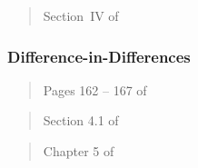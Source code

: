 \documentclass[12pt]{article}
\begin{document}
\begin{verse}  \end{verse}

\begin{verse}  \end{verse}

\begin{verse}  \end{verse}

\begin{verse} Section~IV of  \end{verse}

\subsubsection{Difference-in-Differences}\label{sec:did}

\begin{verse}  \end{verse}

\begin{verse} Pages 162 -- 167 of  \end{verse}

\begin{verse} Section 4.1 of  \end{verse}

\begin{verse} Chapter 5 of  \end{verse}

\begin{verse}  \end{verse}

\begin{verse}  \end{verse}

\begin{verse}  \end{verse}

\begin{verse}  \end{verse}

\begin{verse}  \end{verse}

\begin{verse}  \end{verse}
\end{document}
